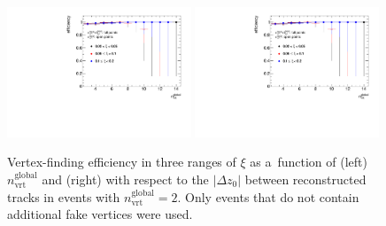 \begin{figure}[h!]
	\centering
	\includegraphics[width=0.49\textwidth,page=1]{chapters/chrgSTAR/img/vertex/vertexEffi_ksi_noFake.pdf}
	\includegraphics[width=0.49\textwidth,page=8]{chapters/chrgSTAR/img/vertex/vertexEffi_ksi_noFake.pdf}
	\caption{Vertex-finding efficiency in three ranges of $\xi$ as a~function of  (left) $n^\textrm{global}_\textrm{vrt}$ and (right) with respect to the $|\Delta z_0|$ between reconstructed tracks in events with $n^\textrm{global}_\textrm{vrt}=2$. Only events that do not contain additional fake vertices were used. }
	\label{fig:vertexEffi_noFake}
\end{figure}

